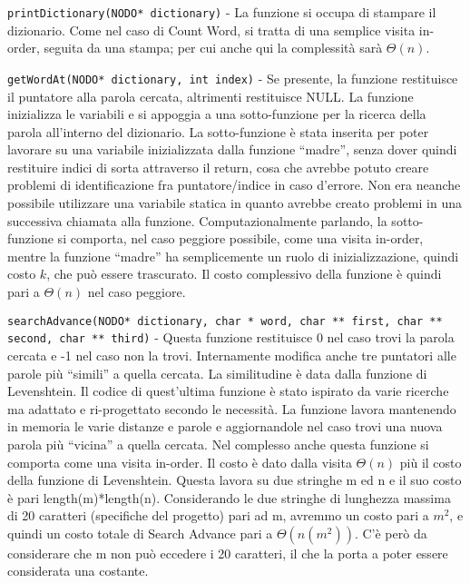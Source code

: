 \documentclass[paper=a4, fontsize=11pt,twoside]{scrartcl}   %
\begin{document}
				\texttt{printDictionary(NODO* dictionary)} - La funzione si occupa di stampare il dizionario. Come nel caso di Count Word, si tratta di una semplice visita in-order, seguita da una stampa; per cui anche qui la complessità sarà $\Theta(n)$.\par
				
				\texttt{getWordAt(NODO* dictionary, int index)} - Se presente, la funzione restituisce il puntatore alla parola cercata, altrimenti restituisce NULL. La funzione inizializza le variabili e si appoggia a una sotto-funzione per la ricerca della parola all’interno del dizionario. La sotto-funzione è stata inserita per poter lavorare su una variabile inizializzata dalla funzione “madre”, senza dover quindi restituire indici di sorta attraverso il return, cosa che avrebbe potuto creare problemi di identificazione fra puntatore/indice in caso d’errore. Non era neanche possibile utilizzare una variabile statica in quanto avrebbe creato problemi in una successiva chiamata alla funzione. Computazionalmente parlando, la sotto-funzione si comporta, nel caso peggiore possibile, come una visita in-order, mentre la funzione “madre” ha semplicemente un ruolo di inizializzazione, quindi costo $k$, che può essere trascurato. Il costo complessivo della funzione è quindi pari a $\Theta(n)$ nel caso peggiore.\par
				
				\texttt{searchAdvance(NODO* dictionary, char * word, char ** first, char ** second, char ** third)} - Questa funzione restituisce 0 nel caso trovi la parola cercata e -1 nel caso non la trovi. Internamente modifica anche tre puntatori alle parole più “simili” a quella cercata. La similitudine è data dalla funzione di Levenshtein. Il codice di quest’ultima funzione è stato ispirato da varie ricerche ma adattato e ri-progettato secondo le necessità. La funzione lavora mantenendo in memoria le varie distanze e parole e aggiornandole nel caso trovi una nuova parola più “vicina” a quella cercata. Nel complesso anche questa funzione si comporta come una visita in-order. Il costo è dato dalla visita $\Theta(n)$ più il costo della funzione di Levenshtein. Questa lavora su due stringhe m ed n e il suo costo è pari length(m)*length(n). Considerando le due stringhe di lunghezza massima di 20 caratteri (specifiche del progetto) pari ad m, avremmo un costo pari a $m^2$, e quindi un costo totale di Search Advance pari a $\Theta(n(m^2))$. C’è però da considerare che m non può eccedere i 20 caratteri, il che la porta a poter essere considerata una costante.\par
				
\end{document}
